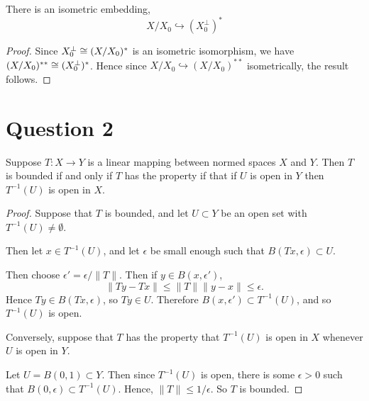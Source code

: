 \documentclass{unswmaths}
\begin{document}
\begin{theorem}
    There is an isometric embedding,
    \begin{equation*}
        X/X_0 \hookrightarrow (X_0^\perp)^*
    \end{equation*}
\end{theorem}
\begin{proof}
    Since $X_0^\perp \cong (X/X_0)^*$ is an isometric isomorphism, we have $(X/X_0)^{**} \cong (X_0^\perp)^*$. 
    Hence since $X/X_0\hookrightarrow (X/X_0)^{**}$ isometrically,
    the result follows.
\end{proof}
\section*{Question 2}
\begin{theorem}
    Suppose $T:X\rightarrow Y$ is a linear mapping between normed spaces $X$ and $Y$. Then $T$ is bounded
    if and only if $T$ has the property if that if $U$ is open in $Y$ then $T^{-1}(U)$ is open in $X$.
\end{theorem}
\begin{proof}
    Suppose that $T$ is bounded, and let $U\subset Y$ be an open set with $T^{-1}(U) \neq \emptyset$. 
    
    Then let $x \in T^{-1}(U)$, and let $\epsilon$ be small enough such that $B(Tx,\epsilon) \subset U$. 
    
    Then choose $\epsilon' = \epsilon/\|T\|$. Then if $y \in B(x, \epsilon')$, 
    \begin{equation*}
        \|Ty-Tx\| \leq \|T\|\|y-x\| \leq \epsilon.
    \end{equation*}
    Hence $Ty \in B(Tx,\epsilon)$, so $Ty \in U$. Therefore $B(x,\epsilon') \subset T^{-1}(U)$, and so $T^{-1}(U)$
    is open.
    
    Conversely, suppose that $T$ has the property that $T^{-1}(U)$ is open in $X$ whenever $U$ is open in $Y$.
    
    Let $U = B(0,1) \subset Y$. Then since $T^{-1}(U)$ is open, there is some $\epsilon > 0$ such
    that $B(0,\epsilon) \subset T^{-1}(U)$. Hence, $\|T\| \leq 1/\epsilon$. So $T$ is bounded.
    
\end{proof}
\end{document}
